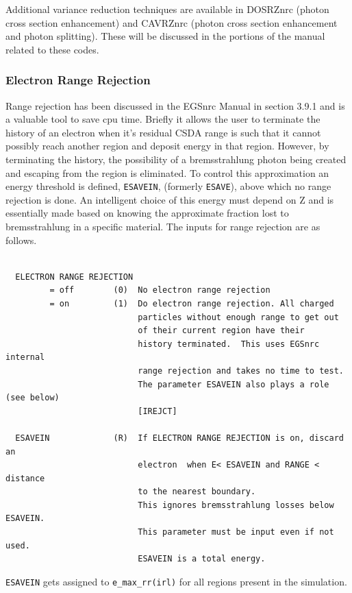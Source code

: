 \documentclass[12pt,twoside]{article}  %
\begin{document}
Additional variance reduction techniques are 
available in DOSRZnrc (photon cross section enhancement) and 
CAVRZnrc (photon cross section enhancement and photon splitting). 
These will be discussed in the portions of the manual related to 
these codes.

\subsubsection{Electron Range Rejection}

Range rejection has been discussed in the EGSnrc Manual
\cite{KR00} in section 3.9.1
and is a valuable tool to save cpu time. 
Briefly it allows the user to terminate the history of an electron when
it's residual CSDA range is such that it cannot possibly reach another 
region and deposit energy in that region. However, by terminating the
history, the possibility of a bremsstrahlung photon being created and
escaping from the region is eliminated. To control this approximation
an energy threshold is defined, \verb+ESAVEIN+, (formerly 
\verb+ESAVE+), above which no range rejection is done. An intelligent
choice of this energy must depend on Z and is essentially 
made based on knowing the approximate fraction lost to bremsstrahlung in a 
specific material. The inputs for range rejection are as follows.

\begin{verbatim}

  ELECTRON RANGE REJECTION
         = off        (0)  No electron range rejection
         = on         (1)  Do electron range rejection. All charged
                           particles without enough range to get out
                           of their current region have their
                           history terminated.  This uses EGSnrc internal
                           range rejection and takes no time to test.
                           The parameter ESAVEIN also plays a role (see below)
                           [IREJCT]

  ESAVEIN             (R)  If ELECTRON RANGE REJECTION is on, discard an
                           electron  when E< ESAVEIN and RANGE < distance
                           to the nearest boundary.
                           This ignores bremsstrahlung losses below ESAVEIN.
                           This parameter must be input even if not used.
                           ESAVEIN is a total energy.                 
\end{verbatim}
\noindent \verb+ESAVEIN+ gets assigned to \verb+e_max_rr(irl)+ for all 
regions present in the simulation.
\end{document}
